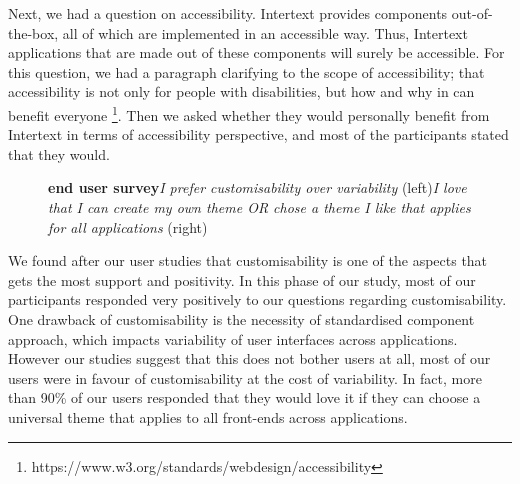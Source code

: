 Next, we had a question on accessibility. Intertext provides components out-of-the-box, all of which are implemented in an accessible way. Thus, Intertext applications that are made out of these components will surely be accessible. For this question, we had a paragraph clarifying to the scope of accessibility; that accessibility is not only for people with disabilities, but how and why in can benefit everyone \footnote{https://www.w3.org/standards/webdesign/accessibility}. Then we asked whether they would personally benefit from Intertext in terms of accessibility perspective, and most of the participants stated that they would.


\begin{figure}[H]
\centering
{}
\vspace*{-5mm}
\caption{\textbf{end user survey}\newline\textit{I prefer customisability over variability} (left)\newline\textit{I love that I can create my own theme OR chose a theme I like that applies for all applications} (right)} \label{fig:ev_p2_4}
\end{figure}

We found after our user studies that customisability is one of the aspects that gets the most support and positivity. In this phase of our study, most of our participants responded very positively to our questions regarding customisability. One drawback of customisability is the necessity of standardised component approach, which impacts variability of user interfaces across applications. However our studies suggest that this does not bother users at all, most of our users were in favour of customisability at the cost of variability. In fact, more than 90\% of our users responded that they would love it if they can choose a universal theme that applies to all front-ends across applications.


